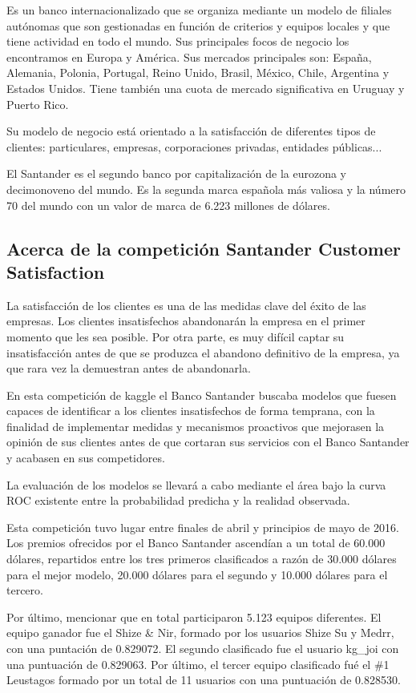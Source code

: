 \documentclass[11pt,a4paper,spanish]{article} %
\begin{document}
Es un banco internacionalizado que se organiza mediante un modelo de filiales autónomas que son gestionadas en función de criterios y equipos locales y que tiene actividad en todo el mundo. Sus principales focos de negocio los encontramos en Europa y América. Sus mercados principales son: España, Alemania, Polonia, Portugal, Reino Unido, Brasil, México, Chile, Argentina y Estados Unidos. Tiene también una cuota de mercado significativa en Uruguay y Puerto Rico. 

Su modelo de negocio está orientado a la satisfacción de diferentes tipos de clientes: particulares, empresas, corporaciones privadas, entidades públicas... 

El Santander es el segundo banco por capitalización de la eurozona y decimonoveno del mundo. Es la segunda marca española más valiosa y la número 70 del mundo con un valor de marca de 6.223 millones de dólares.



\subsection{Acerca de la competición Santander Customer Satisfaction}
La satisfacción de los clientes es una de las medidas clave del éxito de las empresas. Los clientes insatisfechos abandonarán la empresa en el primer momento que les sea posible. Por otra parte, es muy difícil captar su insatisfacción antes de que se produzca el abandono definitivo de la empresa, ya que rara vez la demuestran antes de abandonarla.

En esta competición de kaggle el Banco Santander buscaba modelos que fuesen capaces de identificar a los clientes insatisfechos de forma temprana, con la finalidad de implementar medidas y mecanismos proactivos que mejorasen la opinión de sus clientes antes de que cortaran sus servicios con el Banco Santander y acabasen en sus competidores. 

La evaluación de los modelos se llevará a cabo mediante el área bajo la curva ROC existente entre la probabilidad predicha y la realidad observada.

Esta competición tuvo lugar entre finales de abril y principios de mayo de 2016. Los premios ofrecidos por el Banco Santander ascendían a un total de 60.000 dólares, repartidos entre los tres primeros clasificados a razón de 30.000 dólares para el mejor modelo, 20.000 dólares para el segundo y 10.000 dólares para el tercero. 

Por último, mencionar que en total participaron 5.123 equipos diferentes. El equipo ganador fue el Shize \& Nir, formado por los usuarios Shize Su y Medrr, con una puntación de 0.829072. El segundo clasificado fue el usuario kg\_joi con una puntuación de 0.829063. Por último, el tercer equipo clasificado fué el \#1 Leustagos formado por un total de 11 usuarios con una puntuación de 0.828530.
\end{document}
